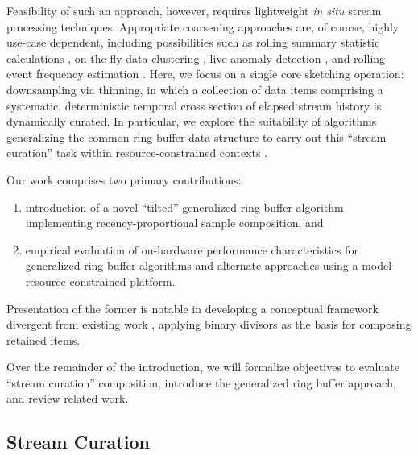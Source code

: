 Feasibility of such an approach, however, requires lightweight \textit{in situ} stream processing techniques.
Appropriate coarsening approaches are, of course, highly use-case dependent, including possibilities such as rolling summary statistic calculations \citep{lin2004continuously}, on-the-fly data clustering \citep{silva2013data}, live anomaly detection \citep{cai2004maids}, and rolling event frequency estimation \citep{manku2002approximate}.
Here, we focus on a single core sketching operation: downsampling via thinning, in which a collection of data items comprising a systematic, deterministic temporal cross section of elapsed stream history is dynamically curated.
In particular, we explore the suitability of algorithms generalizing the common ring buffer data structure to carry out this ``stream curation'' task  within resource-constrained contexts \citep{gunther2014compressing}.

Our work comprises two primary contributions:
\begin{enumerate}
\item introduction of a novel ``tilted'' generalized ring buffer algorithm implementing recency-proportional sample composition, and
\item empirical evaluation of on-hardware performance characteristics for generalized ring buffer algorithms and alternate approaches using a model resource-constrained platform.
\end{enumerate}
Presentation of the former is notable in developing a conceptual framework divergent from existing work \citep{gunther2014compressing}, applying binary divisors as the basis for composing retained items.

Over the remainder of the introduction, we will formalize objectives to evaluate ``stream curation'' composition, introduce the generalized ring buffer approach, and review related work.

\subsection{Stream Curation}
\label{sec:stream-curation-problem}

